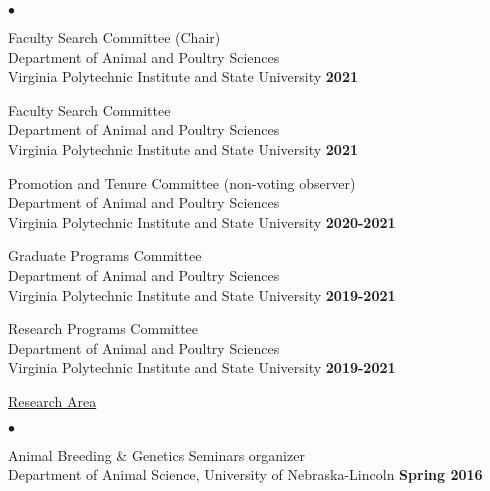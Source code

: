 \documentclass[margin,line,10pt]{res}
\newenvironment{list2}{
  \begin{list}{$\bullet$}{%
      \setlength{\itemsep}{0in}
      \setlength{\parsep}{0in} \setlength{\parskip}{0in}
      \setlength{\topsep}{0in} \setlength{\partopsep}{0in} 
      \setlength{\leftmargin}{0.2in}}}{\end{list}}
\begin{document}
\begin{resume}
\begin{list2}
  \item Faculty Search Committee (Chair) \\
  Department of Animal and Poultry Sciences \\ Virginia Polytechnic Institute and State University   \hfill \textbf{2021}\\

  
  \vspace{0.3cm}

   \item  Faculty Search Committee \\
  Department of Animal and Poultry Sciences \\ Virginia Polytechnic Institute and State University   \hfill \textbf{2021}\\

      \vspace{0.3cm}
  
\item Promotion and Tenure Committee (non-voting observer) \\
  Department of Animal and Poultry Sciences \\ Virginia Polytechnic Institute and State University   \hfill \textbf{2020-2021}\\

    \vspace{0.3cm}


\item Graduate Programs Committee \\
  Department of Animal and Poultry Sciences \\ Virginia Polytechnic Institute and State University   \hfill \textbf{2019-2021}\\

  \vspace{0.3cm}
  
\item Research Programs Committee \\
  Department of Animal and Poultry Sciences \\ Virginia Polytechnic Institute and State University  \hfill \textbf{2019-2021}\\

  \vspace{0.3cm}

\end{list2}


\begin{flushleft}
\hspace{0.3cm} \underline{Research Area}
\end{flushleft}
\begin{list2}
\item Animal Breeding \& Genetics Seminars organizer \\
  Department of Animal Science, University of Nebraska-Lincoln   \hfill \textbf{Spring 2016}\\


\end{list2}
\end{resume}
\end{document}
